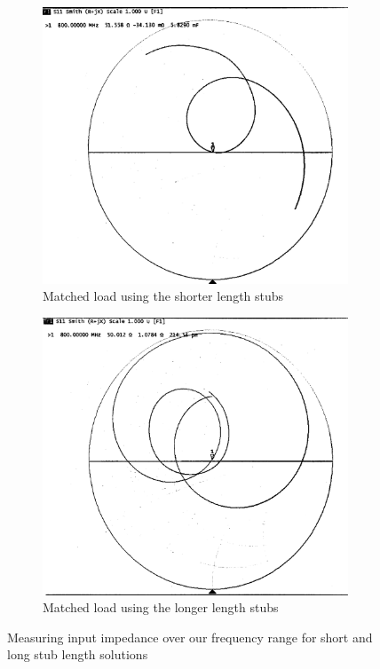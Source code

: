 \documentclass[10pt]{article}
\begin{document}
\begin{figure}[ht]
  \centering
  \begin{subfigure}[b]{0.45\textwidth}
      \includegraphics[width=\textwidth]{../photos/lab3/matching_short_pair.jpg}
      \caption{Matched load using the shorter length stubs}
  \end{subfigure}
  \quad
  \begin{subfigure}[b]{0.45\textwidth}
    \includegraphics[width=\textwidth]{../photos/lab3/matching_long_pair.jpg}
    \caption{Matched load using the longer length stubs}
  \end{subfigure}
  \caption{Measuring input impedance over our frequency range for short and long stub length solutions\vspace{-0.3cm}}
  \label{matched_stubs}
\end{figure}
\end{document}
